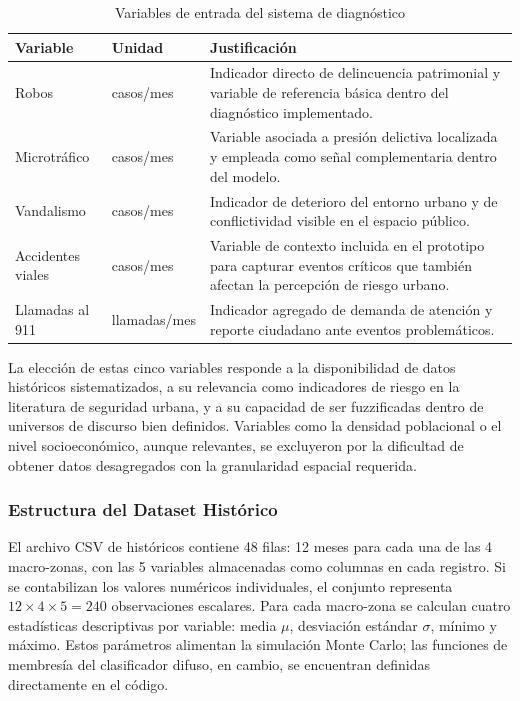 \documentclass[11pt]{article}
\begin{document}
\begin{table}[H]
    \centering
    \begin{tabular}{p{3.3cm}p{2.4cm}p{6.8cm}}
        \toprule
        \textbf{Variable} & \textbf{Unidad} & \textbf{Justificación} \\
        \midrule
        Robos & casos/mes & Indicador directo de delincuencia patrimonial y variable de referencia básica dentro del diagnóstico implementado. \\
        Microtráfico & casos/mes & Variable asociada a presión delictiva localizada y empleada como señal complementaria dentro del modelo. \\
        Vandalismo & casos/mes & Indicador de deterioro del entorno urbano y de conflictividad visible en el espacio público. \\
        Accidentes viales & casos/mes & Variable de contexto incluida en el prototipo para capturar eventos críticos que también afectan la percepción de riesgo urbano. \\
        Llamadas al 911 & llamadas/mes & Indicador agregado de demanda de atención y reporte ciudadano ante eventos problemáticos. \\
        \bottomrule
    \end{tabular}
    \caption{Variables de entrada del sistema de diagnóstico}
    \par{}
\end{table}

La elección de estas cinco variables responde a la disponibilidad de datos históricos sistematizados, a su relevancia como indicadores de riesgo en la literatura de seguridad urbana, y a su capacidad de ser fuzzificadas dentro de universos de discurso bien definidos. Variables como la densidad poblacional o el nivel socioeconómico, aunque relevantes, se excluyeron por la dificultad de obtener datos desagregados con la granularidad espacial requerida.

\subsubsection{Estructura del Dataset Histórico}

El archivo CSV de históricos contiene 48 filas: 12 meses para cada una de las 4 macro-zonas, con las 5 variables almacenadas como columnas en cada registro. Si se contabilizan los valores numéricos individuales, el conjunto representa $12 \times 4 \times 5 = 240$ observaciones escalares. Para cada macro-zona se calculan cuatro estadísticas descriptivas por variable: media $\mu$, desviación estándar $\sigma$, mínimo y máximo. Estos parámetros alimentan la simulación Monte Carlo; las funciones de membresía del clasificador difuso, en cambio, se encuentran definidas directamente en el código.
\end{document}
